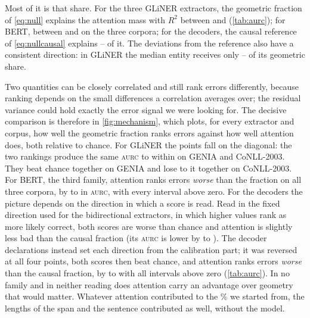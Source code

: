 \documentclass[11pt,a4paper]{article}
\newcommand{\gliner}{GLiNER}
\newcommand{\aurc}{\textsc{aurc}}
\begin{document}
Most of it is that share. For the three \gliner{} extractors, the geometric fraction of \cref{eq:null} explains the
attention mass with $R^2$ between \encRsqMin{} and \encRsqMax{} (\cref{tab:aurc}); for BERT, between \bertRsqMin{} and
\bertRsqMax{} on the three corpora; for the decoders, the causal reference of \cref{eq:nullcausal} explains
\decRsqMin--\decRsqMax{} of it. The deviations from the reference also have a consistent direction: in \gliner{} the median
entity receives only \encObsExpMin--\encObsExpMax{} of its geometric share.

Two quantities can be closely correlated and still rank errors differently, because ranking depends on the small
differences a correlation averages over; the residual variance could hold exactly the error signal we were looking for.
The decisive comparison is therefore in \cref{fig:mechanism}, which plots, for every extractor and corpus, how well the
geometric fraction ranks errors against how well attention does, both relative to chance. For \gliner{} the points fall on
the diagonal: the two rankings produce the same \aurc{} to within \encMassGeoMaxGap{} on GENIA and CoNLL-2003. They beat
chance together on GENIA and lose to it together on CoNLL-2003. For BERT, the third family, attention ranks errors
\emph{worse} than the fraction on all three corpora, by \bertCtwoMin{} to \bertCtwoMax{} in \aurc, with every interval above
zero. For the decoders the picture depends on the direction in which a score is read. Read in the fixed direction used for the bidirectional extractors, in which higher values rank as more likely correct, both scores are worse than chance and attention
is slightly less bad than the causal fraction (its \aurc{} is lower by \decRawGapAbsMin{} to \decRawGapAbsMax). The decoder declarations
instead set each direction from the calibration part; it was reversed at all four points, both scores then beat chance, and
attention ranks errors \emph{worse} than the causal fraction, by \decCalGapMin{} to \decCalGapMax{} with all
\decCalGapAdv{} intervals above zero (\cref{tab:aurc}). In no family and in neither reading does attention carry an
advantage over geometry that would matter. Whatever attention contributed to the \rrGeniaMassBase\% we started from, the
lengths of the span and the sentence contributed as well, without the model.
\end{document}

